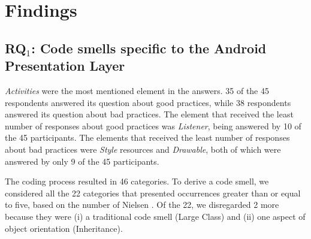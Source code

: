 \section{Findings}

\subsection{RQ$_1$: Code smells specific to the Android Presentation Layer}
\label{phase1-results}

\textit{Activities} were the most mentioned element in the answers. 35 of the 45 respondents answered its question about good practices, while 38 respondents answered its question about bad practices.
The element that received the least number of responses about good practices was \textit{Listener}, being answered by 10 of the 45 participants. The elements that received the least number of responses about bad practices were \textit{Style} resources and \textit{Drawable}, both of which were answered by only 9 of the 45 participants. 

The coding process resulted in 46 categories. To derive a code smell, we considered 
all the 22 categories that presented occurrences greater than or equal to five, based on the number of Nielsen \cite{NielsenMagicNumber:00}.
Of the 22, we disregarded 2 more because they were (i) a traditional code smell (Large Class) and (ii) one aspect of object orientation (Inheritance). 

